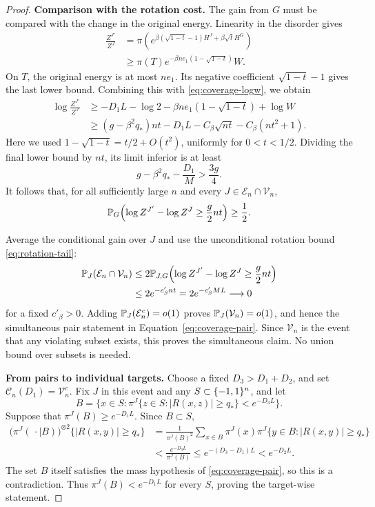 \begin{proof}
\par\medskip\noindent\textbf{Comparison with the rotation cost.}\enspace
The gain from $G$ must be compared with the change in the original energy.
Linearity in the disorder gives
\begin{align*}
 \frac{Z^{J'}}{Z^J}
 &=\pi\!\left(
    e^{\beta(\sqrt{1-t}-1)H^J+\beta\sqrt t H^G}\right)\\
 &\ge\pi(T)e^{-\beta ne_1(1-\sqrt{1-t})}W.
\end{align*}
On $T$, the original energy is at most $ne_1$. Its negative coefficient
$\sqrt{1-t}-1$ gives the last lower bound. Combining this with
\eqref{eq:coverage-logw}, we obtain
\begin{align*}
 \log\frac{Z^{J'}}{Z^J}
 &\ge -D_1L-\log2-\beta ne_1(1-\sqrt{1-t})+\log W\\
 &\ge (g-\beta^2q_*)nt-D_1L
        -C_\beta\sqrt{nt}-C_\beta(nt^2+1).
\end{align*}
Here we used $1-\sqrt{1-t}=t/2+O(t^2)$, uniformly for
$0<t<1/2$.  Dividing the final lower bound by $nt$, its limit
inferior is at least
\[
 g-\beta^2q_* -\frac{D_1}{M}>\frac{3g}{4}.
\]
It follows that, for all sufficiently large $n$ and every
$J\in\mathcal E_n\cap\mathcal V_n$,
\begin{equation}
 \mathbb P_G\!\left(
    \log Z^{J'}-\log Z^J\ge\frac g2nt
    \right)\ge\frac12.
 \label{eq:coverage-gain}
\end{equation}

Average the conditional gain over $J$ and use the unconditional rotation
bound \eqref{eq:rotation-tail}:
\begin{align*}
 \mathbb P_J(\mathcal E_n\cap\mathcal V_n)
 &\le2\mathbb P_{J,G}\!\left(
       \log Z^{J'}-\log Z^J\ge\frac g2nt\right)\\
 &\le2e^{-c'_\beta nt}
   =2e^{-c'_\beta ML}\longrightarrow0
\end{align*}
for a fixed $c'_\beta>0$.  Adding
$\mathbb P_J(\mathcal E_n^c)=o(1)$ proves
$\mathbb P_J(\mathcal V_n)=o(1)$, and hence the simultaneous pair
statement in Equation~\eqref{eq:coverage-pair}.  Since $\mathcal V_n$ is the event that any violating subset exists, this
proves the simultaneous claim. No union bound over subsets is needed.

\par\medskip\noindent\textbf{From pairs to individual targets.}\enspace
Choose a fixed $D_3>D_1+D_2$, and set
$\mathcal C_n(D_1)=\mathcal V_n^c$.  Fix $J$ in this event and
any $S\subset\{-1,1\}^n$, and let
\[
 B=\{x\in S:\pi^J\{z\in S:|R(x,z)|\ge q_*\}<e^{-D_3L}\}.
\]
Suppose that $\pi^J(B)\ge e^{-D_1L}$.  Since $B\subset S$,
\begin{align*}
 \bigl(\pi^J(\,\cdot\mid B)\bigr)^{\otimes2}
     \{|R(x,y)|\ge q_*\}
 &=\frac{1}{\pi^J(B)^2}
   \sum_{x\in B}\pi^J(x)
      \pi^J\{y\in B:|R(x,y)|\ge q_*\}\\
 &<\frac{e^{-D_3L}}{\pi^J(B)}
 \le e^{-(D_3-D_1)L}
 <e^{-D_2L}.
\end{align*}
The set $B$ itself satisfies the mass hypothesis of
\eqref{eq:coverage-pair}, so this is a contradiction. Thus
$\pi^J(B)<e^{-D_1L}$ for every $S$, proving the target-wise statement.
\end{proof}
